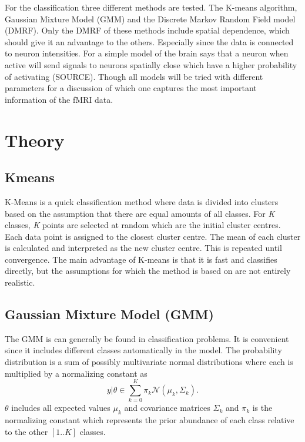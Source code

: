 \documentclass[a4paper,english]{article}
\begin{document}
For the classification three different methods are tested.
The K-means algorithm, Gaussian Mixture Model (GMM) and the Discrete Markov Random Field model (DMRF).
Only the DMRF of these methods include spatial dependence, which should give it an advantage to the others.
Especially since the data is connected to neuron intensities.
For a simple model of the brain says that a neuron when active will send signals to neurons spatially close which have a higher probability of activating (SOURCE).
Though all models will be tried with different parameters for a discussion of which one captures the most important information of the fMRI data.

\section{Theory}

\subsection{Kmeans}

K-Means is a quick classification method where data is divided into clusters based on the assumption that there are equal amounts of all classes. For \textit{K} classes, \textit{K} points are selected at random which are the initial cluster centres. Each data point is assigned to the closest cluster centre. The mean of each cluster is calculated and interpreted as the new cluster centre. This is repeated until convergence. The main advantage of K-means is that it is fast and classifies directly, but the assumptions for which the method is based on are not entirely realistic.


\subsection{Gaussian Mixture Model (GMM)}
The GMM is can generally be found in classification problems.
It is convenient since it includes different classes automatically in the model.
The probability distribution is a sum of possibly multivariate normal distributions where each is multiplied by a normalizing constant as
\begin{equation}
  y | \theta \in \sum_{k = 0}^K \pi_k \mathcal{N}(\mu_k, \Sigma_k).
  \label{eq:gmm}
\end{equation}
$\theta$ includes all expected values $\mu_k$ and covariance matrices $\Sigma_k$ and $\pi_k$ is the normalizing constant which represents the prior abundance of each class relative to the other $[1..K]$ classes.
\end{document}

